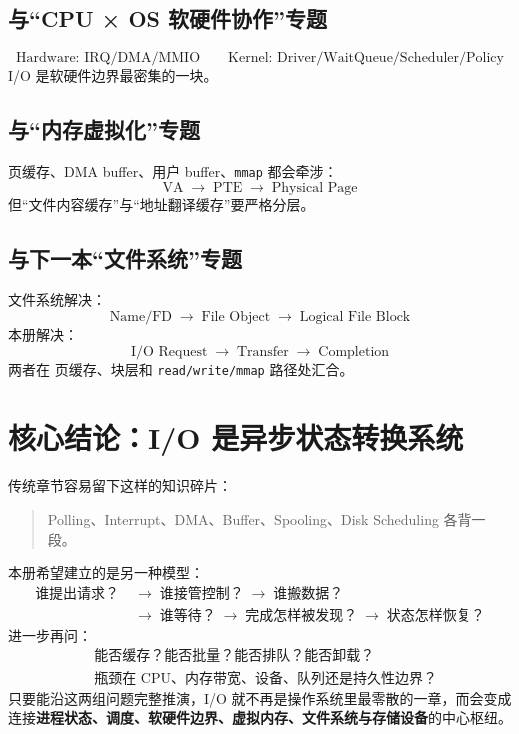 \documentclass[UTF8,fontset=fandol,11pt,a4paper]{ctexart}
\newcommand{\kw}[1]{\textbf{#1}}
\newcommand{\code}[1]{\texttt{#1}}
\newcommand{\arr}{\;\longrightarrow\;}
\begin{document}
\subsection{与“CPU × OS 软硬件协作”专题}
\[
\boxed{
\text{Hardware: IRQ/DMA/MMIO}
\qquad
\text{Kernel: Driver/WaitQueue/Scheduler/Policy}
}
\]
I/O 是软硬件边界最密集的一块。

\subsection{与“内存虚拟化”专题}
页缓存、DMA buffer、用户 buffer、\code{mmap} 都会牵涉：
\[
\text{VA}\arr\text{PTE}\arr\text{Physical Page}
\]
但“文件内容缓存”与“地址翻译缓存”要严格分层。

\subsection{与下一本“文件系统”专题}
文件系统解决：
\[
\boxed{\text{Name/FD}\arr\text{File Object}\arr\text{Logical File Block}}
\]
本册解决：
\[
\boxed{\text{I/O Request}\arr\text{Transfer}\arr\text{Completion}}
\]
两者在 页缓存、块层和 \code{read/write/mmap} 路径处汇合。

\section{核心结论：I/O 是异步状态转换系统}
传统章节容易留下这样的知识碎片：
\begin{quote}
Polling、Interrupt、DMA、Buffer、Spooling、Disk Scheduling 各背一段。
\end{quote}
本册希望建立的是另一种模型：
\[
\boxed{
\begin{aligned}
\text{谁提出请求？}&\arr\text{谁接管控制？}\arr\text{谁搬数据？}\\
&\arr\text{谁等待？}\arr\text{完成怎样被发现？}\arr\text{状态怎样恢复？}
\end{aligned}}
\]
进一步再问：
\[
\boxed{
\begin{aligned}
&\text{能否缓存？能否批量？能否排队？能否卸载？}\\
&\text{瓶颈在 CPU、内存带宽、设备、队列还是持久性边界？}
\end{aligned}}
\]
只要能沿这两组问题完整推演，I/O 就不再是操作系统里最零散的一章，而会变成连接\kw{进程状态、调度、软硬件边界、虚拟内存、文件系统与存储设备}的中心枢纽。

\newpage
\end{document}
